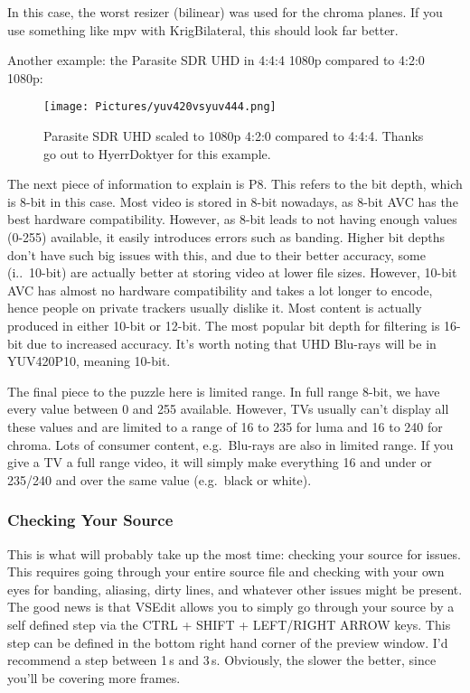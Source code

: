 \documentclass{scrartcl}
\begin{document}
In this case, the worst resizer (bilinear) was used for the chroma planes.  If you use something like mpv with KrigBilateral, this should look far better.

Another example: the Parasite SDR UHD in 4:4:4 1080p compared to 4:2:0 1080p:
\begin{figure}[h]
\centering
\texttt{[image: Pictures/yuv420vsyuv444.png]}
\caption{Parasite SDR UHD scaled to 1080p 4:2:0 compared to 4:4:4.  Thanks go out to HyerrDoktyer for this example.}
\end{figure}

The next piece of information to explain is P8.  This refers to the bit depth, which is 8-bit in this case.  Most video is stored in 8-bit nowadays, as 8-bit AVC has the best hardware compatibility.  However, as 8-bit leads to not having enough values (0-255) available, it easily introduces errors such as banding.  Higher bit depths don't have such big issues with this, and due to their better accuracy, some (i.\@e.\ 10-bit) are actually better at storing video at lower file sizes.  However, 10-bit AVC has almost no hardware compatibility and takes a lot longer to encode, hence people on private trackers usually dislike it.  Most content is actually produced in either 10-bit or 12-bit.  The most popular bit depth for filtering is 16-bit due to increased accuracy.  It's worth noting that UHD Blu-rays will be in YUV420P10, meaning 10-bit.

The final piece to the puzzle here is limited range.  In full range 8-bit, we have every value between 0 and 255 available.  However, TVs usually can't display all these values and are limited to a range of 16 to 235 for luma and 16 to 240 for chroma.  Lots of consumer content, e\@.g.\ Blu-rays are also in limited range.  If you give a TV a full range video, it will simply make everything 16 and under or 235/240 and over the same value (e.g.\ black or white).

\subsubsection{Checking Your Source}
This is what will probably take up the most time: checking your source for issues.  This requires going through your entire source file and checking with your own eyes for banding, aliasing, dirty lines, and whatever other issues might be present.  The good news is that VSEdit allows you to simply go through your source by a self defined step via the CTRL + SHIFT + LEFT/RIGHT ARROW keys.  This step can be defined in the bottom right hand corner of the preview window.  I'd recommend a step between 1\,s and 3\,s.  Obviously, the slower the better, since you'll be covering more frames.
\end{document}
